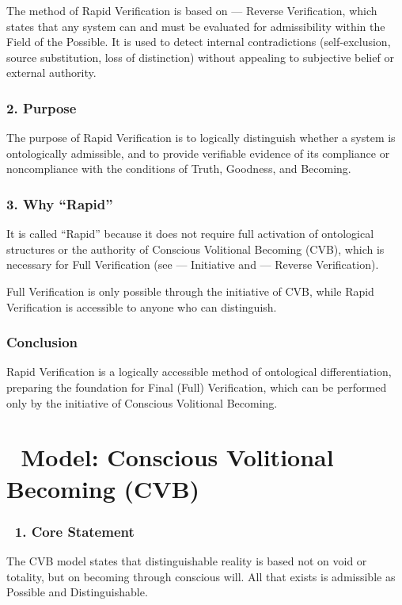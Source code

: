 \documentclass[12pt]{article}
\begin{document}
The method of Rapid Verification is based on \text{[25]} — Reverse Verification, which states that any system can and must be evaluated for admissibility within the Field of the Possible. It is used to detect internal contradictions (self-exclusion, source substitution, loss of distinction) without appealing to subjective belief or external authority.

\subsubsection*{2. Purpose}

The purpose of Rapid Verification is to logically distinguish whether a system is ontologically admissible, and to provide verifiable evidence of its compliance or noncompliance with the conditions of Truth, Goodness, and Becoming.

\subsubsection*{3. Why ``Rapid''}

It is called ``Rapid'' because it does not require full activation of ontological structures or the authority of Conscious Volitional Becoming (CVB), which is necessary for Full Verification (see \text{[23]} — Initiative and \text{[25]} — Reverse Verification).

Full Verification is only possible through the initiative of CVB, while Rapid Verification is accessible to anyone who can distinguish.

\subsubsection*{Conclusion}

Rapid Verification is a logically accessible method of ontological differentiation, preparing the foundation for Final (Full) Verification, which can be performed only by the initiative of Conscious Volitional Becoming.

\section*{🔷 Model: Conscious Volitional Becoming (CVB)}

\subsubsection*{🔷 1. Core Statement}

The CVB model states that distinguishable reality is based not on void or totality, but on becoming through conscious will. All that exists is admissible as Possible and Distinguishable.
\end{document}
